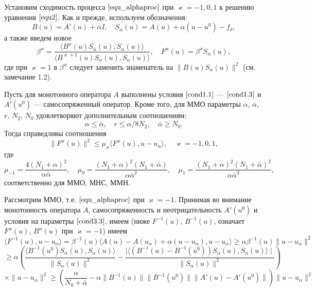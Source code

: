 Установим сходимость процесса $\eqref{equ_alphaproc}$ при $\varkappa=-1,0,1$ к решению уравнения $\eqref{equ2}$. Как и прежде, используем обозначения: \begin{equation*}B(u)=A'(u)+\bar\alpha I, \quad S_\alpha (u)=A(u)+\alpha(u-u^0)-f_\delta,\end{equation*}
а также введем новое
$$\beta ^\varkappa =\frac{\langle B^\varkappa(u)S_\alpha(u), S_\alpha (u)\rangle}{\langle B^{\varkappa +1}(u)S_\alpha(u), S_\alpha(u)\rangle}, \quad F^\varkappa(u)=\beta^\varkappa S_\alpha(u), $$ где при $\varkappa=1$ в $\beta^\varkappa$ следует заменить знаменатель на $\|B(u)S_\alpha(u)\|^2$ (см. замечание 1.2).
\begin{theorem}\label{teo3.1}
	Пусть для монотонного оператора $A$ выполнены условия $\eqref{cond1.1}$ --- $\eqref{cond1.3}$ и $A'(u^0)$ --- самосопряженный оператор. Кроме того, для ММО параметры $\alpha$, $\bar\alpha$, $r$, $N_2$, $N_0$ удовлетворяют дополнительным соотношениям:
	\begin{equation}\label{cond3.3}
	\alpha \le \bar\alpha, \quad r\le \alpha/8N_2, \quad \bar\alpha \ge N_0.
	\end{equation}
	Тогда справедливы соотношения
	\begin{equation}\label{ineq3.4}
	\|F^\varkappa(u)\|^2 \le \mu_\varkappa\langle F^\varkappa(u), u-u_\alpha\rangle, \quad \varkappa=-1,0,1,
	\end{equation} где
	\begin{equation}\label{cond3.5}
	\mu _{-1}=\frac{4(N_1+\alpha)^2}{\alpha\bar\alpha}, \quad \mu _0= \frac{(N_1+\alpha)^2(N_1+\bar\alpha)}{\alpha{\bar\alpha}^2}, \quad \mu_1= \frac{(N_1+\alpha)^2(N_1+\bar\alpha)^2}{\alpha{\bar\alpha}^3},
	\end{equation}
	соответственно для ММО, МНС, ММН.
\end{theorem}
\proof Рассмотрим  ММО, т.е. $\eqref{equ_alphaproc}$ при $\varkappa=-1$. Принимая во внимание монотонность оператора $A$, самосопряженность и неотрицательность $A'(u^0)$ и условия на параметры $\eqref{cond3.3}$, имеем (ниже $F^{-1}(u)$, $B^{-1}(u)$, означает $F^\varkappa(u)$, $B^\varkappa(u)$ при $\varkappa=-1$) имеем
$$ \langle F^{-1}(u), u-u_\alpha\rangle=\beta^{-1}(u)\langle A(u)-A(u_\alpha)+ \alpha(u-u_\alpha),u-u_\alpha\rangle\ge\alpha\beta^{-1}(u)\|u-u_\alpha\|^2
$$ $$\ge\alpha\left(\frac{\langle B^{-1}(u^0)S_\alpha(u), S_\alpha(u)\rangle}{\|S_\alpha (u)\|^2}-\frac{\mid\langle (B^{-1}(u)-B^{-1}(u^0))S_\alpha(u), S_\alpha (u)\rangle \mid}{\|S_\alpha (u)\|^2}\right)$$
$$\times \|u-u_\alpha\|^2 \ge\left(\frac{\alpha}{N_0+\bar\alpha}-\alpha\|B^{-1}(u)\|\|B^{-1}(u^0)\|\|A'(u)-A'(u^0)\|\right)\|u-u_\alpha\|^2$$ 
